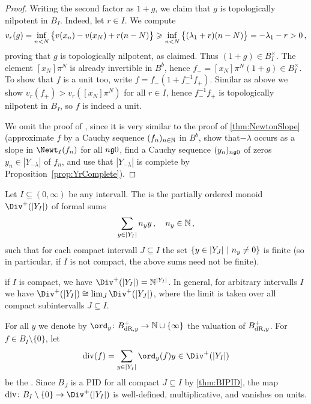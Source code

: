 \documentclass[a4paper, 10pt, oneside, DIV=9, chapterprefix=true, numbers=enddot,bibliography=totoc]{scrbook}
\begin{document}
\begin{proof}
	Writing the second factor as $1+g$, we claim that $g$ is topologically nilpotent in $B_I$. Indeed, let $r\in I$. We compute
	\begin{equation*}
		v_r(g)=\mathop{\operatorname{\mathrm{inf}}}_{n<N}\big\{v(x_n)-v(x_N)+r(n-N)\big\}\geqslant \mathop{\operatorname{\mathrm{inf}}}_{n<N}\big\{(\lambda_1+r)(n-N)\big\}=-\lambda_1-r>0\,,
	\end{equation*}
	proving that $g$ is topologically nilpotent, as claimed. Thus $(1+g)\in B_I^\times$. The element $[x_N]\pi^N$ is already invertible in $B^b$, hence $f_-=[x_N]\pi^N(1+g)\in B_I^\times$. To show that $f$ is a unit too, write $f=f_-(1+f_-^{-1}f_+)$. Similar as above we show $v_r(f_+)>v_r([x_N]\pi^N)$ for all $r\in I$, hence $f_-^{-1}f_+$ is topologically nilpotent in $B_I$, so $f$ is indeed a unit.
	
	We omit the proof of , since it is very similar to the proof of \cref{thm:NewtonSlope} (approximate $f$ by a Cauchy sequence $(f_n)_{n\in\mathbb{N}}$ in $B^b$, show that$-\lambda$ occurs as a slope in $\Newt_I(f_n)$ for all $n\gge 0$, find a Cauchy sequence $(y_n)_{n\gge 0}$ of zeros $y_n\in |Y_{-\lambda}|$ of $f_n$, and use that $|Y_{-\lambda}|$ is complete by Proposition~\cref{prop:YrComplete}).
\end{proof}
\begin{defi}
	Let $I\subseteq (0,\infty)$ be any intervall. The  is the partially ordered monoid $\Div^+(|Y_I|)$ of formal sums
	\begin{equation*}
		\sum_{y\in|Y_I|}n_yy\,,\quad n_y\in\mathbb{N}\,,
	\end{equation*}
	such that for each compact intervall $J\subseteq I$ the set $\left\{y\in|Y_J|\ \middle|\  n_y\neq 0\right\}$ is finite (so in particular, if $I$ is not compact, the above sums need not be finite).
\end{defi}
\begin{exm}
	if $I$ is compact, we have $\Div^+(|Y_I|)=\IN^{|Y_I|}$. In general, for arbitrary intervalls $I$ we have $\Div^+(|Y_I|)\cong \limit_{J}\Div^+(|Y_J|)$, where the limit is taken over all compact subintervalls $J\subseteq I$.
\end{exm}
\begin{defi}\label{def:div}
	For all $y$ we denote by $\ord_y\colon B_{\dR,y}^+\morphism \IN\cup\{\infty\}$ the valuation of $B_{\mathrm{dR},y}^+$. For $f\in B_I\setminus\{0\}$, let
	\begin{equation*}
		\div(f)=\sum_{y\in|Y_I|}\ord_y(f)y\in \Div^+(|Y_I|)
	\end{equation*}
	be the . Since $B_J$ is a PID for all compact $J\subseteq I$ by \cref{thm:BIPID}, the map $\div\colon B_I\setminus\{0\}\morphism \Div^+(|Y_I|)$ is well-defined, multiplicative, and vanishes on units.
\end{defi}
\end{document}
